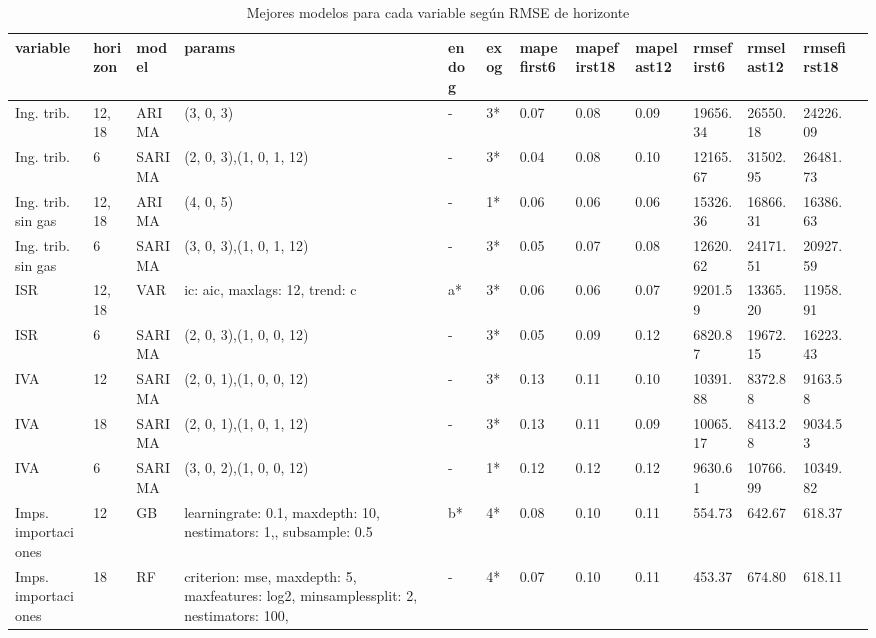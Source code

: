 \documentclass[a4paper, 11pt]{article}
\begin{document}
\begin{landscape}
\hspace{-3cm}
\begin{longtable}{p{3em}p{3em}p{5em}p{7em}p{2em}p{2em}p{2em}p{2em}p{2em}p{2em}p{2em}p{2em}p{2em}}
\caption{\label{tab:best_models}Mejores modelos para cada variable según RMSE de horizonte}\\
variable & \multicolumn{1}{l}{horizon} & model & params & endog & exog & \multicolumn{1}{l}{mapefirst6} & \multicolumn{1}{l}{mapefirst18} & \multicolumn{1}{l}{mapelast12} & \multicolumn{1}{l}{rmsefirst6} & \multicolumn{1}{l}{rmselast12} & \multicolumn{1}{l}{rmsefirst18} \\
\hline \hline
Ing. trib. & \multicolumn{1}{l}{12, 18} & ARIMA & (3, 0, 3) & -     & 3*    & 0.07  & 0.08  & 0.09  & 19656.34 & 26550.18 & 24226.09\\
Ing. trib. & 6     & SARIMA & (2, 0, 3),(1, 0, 1, 12) & -     & 3*    & 0.04  & 0.08  & 0.10  & 12165.67 & 31502.95 & 26481.73\\
\hline
Ing. trib. sin gas & \multicolumn{1}{l}{12, 18} & ARIMA & (4, 0, 5) & -     & 1*    & 0.06  & 0.06  & 0.06  & 15326.36 & 16866.31 & 16386.63\\
Ing. trib. sin gas & 6     & SARIMA & (3, 0, 3),(1, 0, 1, 12) & -     & 3*    & 0.05  & 0.07  & 0.08  & 12620.62 & 24171.51 & 20927.59\\
\hline
ISR   & \multicolumn{1}{l}{12, 18} & VAR   & ic: aic, maxlags: 12, trend: c & a*    & 3*    & 0.06  & 0.06  & 0.07  & 9201.59 & 13365.20 & 11958.91\\
ISR   & 6     & SARIMA & (2, 0, 3),(1, 0, 0, 12) & -     & 3*    & 0.05  & 0.09  & 0.12  & 6820.87 & 19672.15 & 16223.43\\
\hline
IVA   & 12    & SARIMA & (2, 0, 1),(1, 0, 0, 12) & -     & 3*    & 0.13  & 0.11  & 0.10  & 10391.88 & 8372.88 & 9163.58\\
IVA   & 18    & SARIMA & (2, 0, 1),(1, 0, 1, 12) & -     & 3*    & 0.13  & 0.11  & 0.09  & 10065.17 & 8413.28 & 9034.53\\
IVA   & 6     & SARIMA & (3, 0, 2),(1, 0, 0, 12) & -     & 1*    & 0.12  & 0.12  & 0.12  & 9630.61 & 10766.99 & 10349.82\\
\hline
Imps. importaciones & 12    & GB    & learningrate: 0.1, maxdepth: 10, nestimators: 1,, subsample: 0.5 & b*    & 4*    & 0.08  & 0.10  & 0.11  & 554.73 & 642.67 & 618.37\\
Imps. importaciones & 18    & RF    & criterion: mse, maxdepth: 5, maxfeatures: log2, minsamplessplit: 2, nestimators: 100,  & -     & 4*    & 0.07  & 0.10  & 0.11  & 453.37 & 674.80 & 618.11\\

\end{longtable}
\end{landscape}
\end{document}
